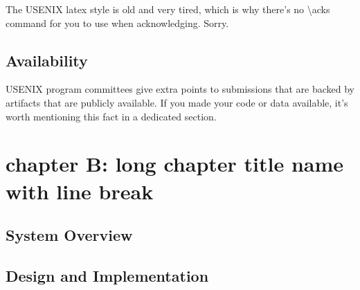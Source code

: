 The USENIX latex style is old and very tired, which is why there's no \textbackslash{}acks command for you to use when acknowledging. Sorry.\par

\section*{Availability}

USENIX program committees give extra points to submissions that are backed by artifacts that are publicly available. If you made your code or data available, it's worth mentioning this fact in a dedicated section.\par

\chapter{chapter B: long chapter title name\\ with line break}
\zhlipsum[8-12]

\section{System Overview}
\zhlipsum[9-13]

\section{Design and Implementation}
\zhlipsum[11-15]

